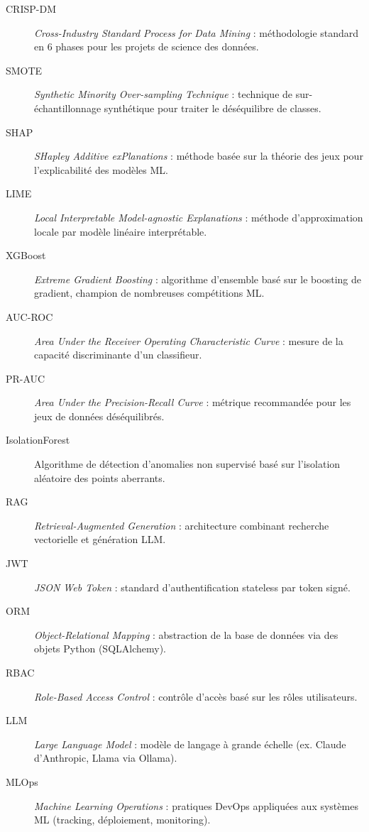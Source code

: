 \documentclass[12pt,a4paper,twoside]{report}
\theoremstyle{definition}
\begin{document}
\begin{description}
  \item[CRISP-DM] \textit{Cross-Industry Standard Process for Data Mining} :
    méthodologie standard en 6 phases pour les projets de science des données.
  \item[SMOTE] \textit{Synthetic Minority Over-sampling Technique} :
    technique de sur-échantillonnage synthétique pour traiter le
    déséquilibre de classes.
  \item[SHAP] \textit{SHapley Additive exPlanations} : méthode basée sur
    la théorie des jeux pour l'explicabilité des modèles ML.
  \item[LIME] \textit{Local Interpretable Model-agnostic Explanations} :
    méthode d'approximation locale par modèle linéaire interprétable.
  \item[XGBoost] \textit{Extreme Gradient Boosting} : algorithme d'ensemble
    basé sur le boosting de gradient, champion de nombreuses compétitions ML.
  \item[AUC-ROC] \textit{Area Under the Receiver Operating Characteristic Curve} :
    mesure de la capacité discriminante d'un classifieur.
  \item[PR-AUC] \textit{Area Under the Precision-Recall Curve} : métrique
    recommandée pour les jeux de données déséquilibrés.
  \item[IsolationForest] Algorithme de détection d'anomalies non supervisé
    basé sur l'isolation aléatoire des points aberrants.
  \item[RAG] \textit{Retrieval-Augmented Generation} : architecture combinant
    recherche vectorielle et génération LLM.
  \item[JWT] \textit{JSON Web Token} : standard d'authentification stateless
    par token signé.
  \item[ORM] \textit{Object-Relational Mapping} : abstraction de la base de
    données via des objets Python (SQLAlchemy).
  \item[RBAC] \textit{Role-Based Access Control} : contrôle d'accès basé sur
    les rôles utilisateurs.
  \item[LLM] \textit{Large Language Model} : modèle de langage à grande échelle
    (ex. Claude d'Anthropic, Llama via Ollama).
  \item[MLOps] \textit{Machine Learning Operations} : pratiques DevOps appliquées
    aux systèmes ML (tracking, déploiement, monitoring).
\end{description}
\end{document}
